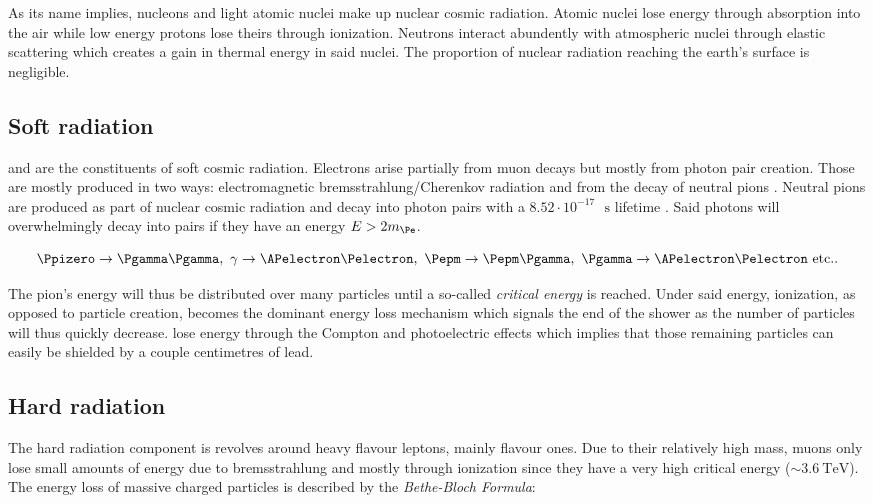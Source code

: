 As its name implies, nucleons and light atomic nuclei make up nuclear cosmic radiation. Atomic nuclei lose energy through absorption into the air while low energy protons lose theirs through ionization. Neutrons interact abundently with atmospheric nuclei through elastic scattering which creates a gain in thermal energy in said nuclei. The proportion of nuclear radiation reaching the earth's surface is negligible.

\subsection{Soft radiation}

\Pgamma and \Pepm are the constituents of soft cosmic radiation. Electrons arise partially from muon decays but mostly from photon pair creation. Those are mostly produced in two ways: electromagnetic bremsstrahlung/Cherenkov radiation and from the decay of neutral pions \Ppizero. Neutral pions are produced as part of nuclear cosmic radiation and decay into photon pairs with a $8.52 \cdot 10^{-17}\text{ }\si{\second}$ lifetime \cite{Tanabashi:2018oca}. Said photons will overwhelmingly decay into \Pepm pairs if they have an energy $E>2m_{\Pe}$.

\begin{equation*}
\Ppizero\rightarrow\Pgamma\Pgamma,\text{   }\gamma\rightarrow\APelectron\Pelectron,\text{   }\Pepm\rightarrow\Pepm\Pgamma,\text{   }\Pgamma\rightarrow\APelectron\Pelectron \text{   etc.}.
\end{equation*}


The pion's energy will thus be distributed over many particles until a so-called \textit{critical energy} is reached. Under said energy, ionization, as opposed to particle creation, becomes the dominant energy loss mechanism which signals the end of the shower as the number of particles will thus quickly decrease. \Pgamma lose energy through the Compton and photoelectric effects which implies that those remaining particles can easily be shielded by a couple centimetres of lead.

\subsection{Hard radiation}

The hard radiation component is revolves around heavy flavour leptons, mainly \Pmu flavour ones. Due to their relatively high mass, muons only lose small amounts of energy due to bremsstrahlung and mostly through ionization since they have a very high critical energy ($\sim \SI{3.6}{\TeV}$). The energy loss of massive charged particles is described by the \textit{Bethe-Bloch Formula}:

